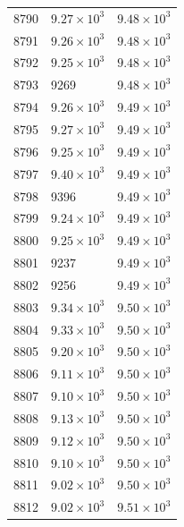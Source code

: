 \begin{table}[H]
\begin{tabular}{lll}
8790 & $\displaystyle 9.27 \times 10^{3}$ & $\displaystyle 9.48 \times 10^{3}$ \\
8791 & $\displaystyle 9.26 \times 10^{3}$ & $\displaystyle 9.48 \times 10^{3}$ \\
8792 & $\displaystyle 9.25 \times 10^{3}$ & $\displaystyle 9.48 \times 10^{3}$ \\
8793 & 9269 & $\displaystyle 9.48 \times 10^{3}$ \\
8794 & $\displaystyle 9.26 \times 10^{3}$ & $\displaystyle 9.49 \times 10^{3}$ \\
8795 & $\displaystyle 9.27 \times 10^{3}$ & $\displaystyle 9.49 \times 10^{3}$ \\
8796 & $\displaystyle 9.25 \times 10^{3}$ & $\displaystyle 9.49 \times 10^{3}$ \\
8797 & $\displaystyle 9.40 \times 10^{3}$ & $\displaystyle 9.49 \times 10^{3}$ \\
8798 & 9396 & $\displaystyle 9.49 \times 10^{3}$ \\
8799 & $\displaystyle 9.24 \times 10^{3}$ & $\displaystyle 9.49 \times 10^{3}$ \\
8800 & $\displaystyle 9.25 \times 10^{3}$ & $\displaystyle 9.49 \times 10^{3}$ \\
8801 & 9237 & $\displaystyle 9.49 \times 10^{3}$ \\
8802 & 9256 & $\displaystyle 9.49 \times 10^{3}$ \\
8803 & $\displaystyle 9.34 \times 10^{3}$ & $\displaystyle 9.50 \times 10^{3}$ \\
8804 & $\displaystyle 9.33 \times 10^{3}$ & $\displaystyle 9.50 \times 10^{3}$ \\
8805 & $\displaystyle 9.20 \times 10^{3}$ & $\displaystyle 9.50 \times 10^{3}$ \\
8806 & $\displaystyle 9.11 \times 10^{3}$ & $\displaystyle 9.50 \times 10^{3}$ \\
8807 & $\displaystyle 9.10 \times 10^{3}$ & $\displaystyle 9.50 \times 10^{3}$ \\
8808 & $\displaystyle 9.13 \times 10^{3}$ & $\displaystyle 9.50 \times 10^{3}$ \\
8809 & $\displaystyle 9.12 \times 10^{3}$ & $\displaystyle 9.50 \times 10^{3}$ \\
8810 & $\displaystyle 9.10 \times 10^{3}$ & $\displaystyle 9.50 \times 10^{3}$ \\
8811 & $\displaystyle 9.02 \times 10^{3}$ & $\displaystyle 9.50 \times 10^{3}$ \\
8812 & $\displaystyle 9.02 \times 10^{3}$ & $\displaystyle 9.51 \times 10^{3}$ \\

\end{tabular}
\end{table}

